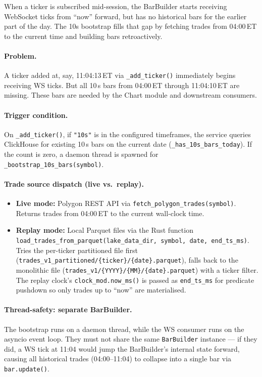 \documentclass[a4paper, 11pt]{article}
\begin{document}
When a ticker is subscribed mid-session, the BarBuilder starts receiving WebSocket
ticks from ``now'' forward, but has no historical bars for the earlier part of the day.
The 10s bootstrap fills that gap by fetching trades from 04:00\,ET to the current
time and building bars retroactively.

\paragraph{Problem.}
A ticker added at, say, 11:04:13\,ET via \texttt{\_add\_ticker()} immediately begins
receiving WS ticks.  But all 10\,s bars from 04:00\,ET through 11:04:10\,ET are missing.
These bars are needed by the Chart module and downstream consumers.

\paragraph{Trigger condition.}
On \texttt{\_add\_ticker()}, if \texttt{"10s"} is in the configured timeframes, the service
queries ClickHouse for existing 10\,s bars on the current date (\texttt{\_has\_10s\_bars\_today}).
If the count is zero, a daemon thread is spawned for \texttt{\_bootstrap\_10s\_bars(symbol)}.

\paragraph{Trade source dispatch (live vs.\ replay).}
\begin{itemize}[nosep]
    \item \textbf{Live mode:} Polygon REST API via \texttt{fetch\_polygon\_trades(symbol)}.
          Returns trades from 04:00\,ET to the current wall-clock time.
    \item \textbf{Replay mode:} Local Parquet files via the Rust function
          \texttt{load\_trades\_from\_parquet(lake\_data\_dir, symbol, date, end\_ts\_ms)}.
          Tries the per-ticker partitioned file first
          (\texttt{trades\_v1\_partitioned/\{ticker\}/\{date\}.parquet}),
          falls back to the monolithic file
          (\texttt{trades\_v1/\{YYYY\}/\{MM\}/\{date\}.parquet}) with a ticker filter.
          The replay clock's \texttt{clock\_mod.now\_ms()} is passed as \texttt{end\_ts\_ms}
          for predicate pushdown so only trades up to ``now'' are materialised.
\end{itemize}

\paragraph{Thread-safety: separate BarBuilder.}
The bootstrap runs on a daemon thread, while the WS consumer runs on the asyncio
event loop.  They must not share the same \texttt{BarBuilder} instance --- if they did,
a WS tick at 11:04 would jump the BarBuilder's internal state forward, causing all
historical trades (04:00--11:04) to collapse into a single bar via \texttt{bar.update()}.
\end{document}
